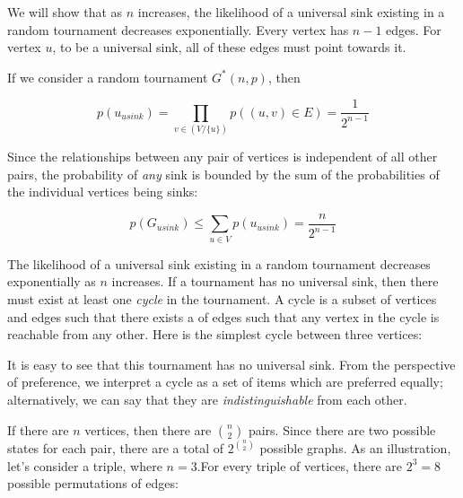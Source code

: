 We will show that as $n$ increases, the likelihood of a universal sink existing in a random tournament decreases exponentially.
Every vertex has $n-1$ edges.
For vertex $u$, to be a universal sink, all of these edges must point towards it.


If we consider a random tournament $G^*(n,p)$, then

\[
p(u_{usink}) = \prod_{v \in (V / \{u\})}p((u,v) \in E) = \frac{1}{2^{n-1}}
\]

Since the relationships between any pair of vertices is independent of all other pairs, the probability of \textit{any} sink is bounded by the sum of the probabilities of the individual vertices being sinks:

\[
p(G_{usink}) \leq \sum_{u \in V}p(u_{usink}) = \frac{n}{2^{n-1}}
\]

The likelihood of a universal sink existing in a random tournament decreases exponentially as $n$ increases.
If a tournament has no universal sink, then there must exist at least one \textit{cycle} in the tournament.
A cycle is a subset of vertices and edges such that there exists a  of edges such that any vertex in the cycle is reachable from any other.
Here is the simplest cycle between three vertices:

\begin{center}
\end{center}

It is easy to see that this tournament has no universal sink.
From the perspective of preference, we interpret a cycle as a set of items which are preferred equally; alternatively, we can say that they are \textit{indistinguishable} from each other.

If there are $n$ vertices, then there are $n\choose{2}$ pairs.
Since there are two possible states for each pair, there are a total of $2^{n\choose{2}}$ possible graphs.
As an illustration, let's consider a triple, where $n = 3$.For every triple of vertices, there are $2^3 = 8$ possible permutations of edges:

